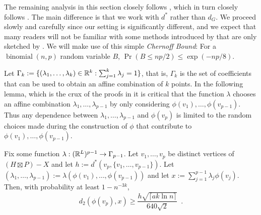 \documentclass{patmorin}
\renewcommand{\ge}{\geqslant}
\renewcommand{\le}{\leqslant}
\newcommand{\defin}[1]{\emph{\textcolor{brightmaroon}{#1}}}
\begin{document}
The remaining analysis in this section closely follows \citet{rao:small}, which in turn closely follows \citet{feige:approximating}.  The main difference is that we work with $d^*$ rather than $d_G$.  We proceed slowly and carefully since our setting is significantly different, and we expect that many readers will not be familiar with some methods introduced by \citet{feige:approximating} that are only sketched by \citet{rao:small}. We will make use of this simple \defin{Chernoff Bound}:  For a $\operatorname{binomial}(n,p)$ random variable $B$, $\Pr(B \le np/2) \le \exp(-np/8)$.

Let $\Gamma_k:=\{(\lambda_1,\ldots,\lambda_k)\in \mathbb{R}^k:\sum_{j=1}^k\lambda_j=1\}$, that is, $\Gamma_k$ is the set of coefficients that can be used to obtain an affine combination of $k$ points.  In the following lemma, which is the crux of the proofs in \cite{rao:small,feige:approximating} it is critical that the function $\lambda$ chooses an affine combination $\lambda_1,\ldots,\lambda_{p-1}$ by only considering $\phi(v_1),\ldots,\phi(v_{p-1})$.  Thus any dependence between $\lambda_1,\ldots,\lambda_{p-1}$ and $\phi(v_p)$ is limited to the random choices made during the construction of $\phi$ that contribute to $\phi(v_1),\ldots,\phi(v_{p-1})$.


\begin{clm}\label{crux}
  Fix some function $\lambda:(\mathbb{R}^{L})^{p-1}\to \Gamma_{p-1}$.
  Let $v_1,\ldots,v_p$ be distinct vertices of $(H\boxtimes P)-X$ and let $h:=d^*(v_p,\{v_1,\ldots,v_{p-1}\})$.  Let $(\lambda_1,\ldots,\lambda_{p-1}):=\lambda(\phi(v_1),\ldots,\phi(v_{p-1}))$ and let $x:=\sum_{j=1}^{p-1}\lambda_j\phi(v_j)$.
  Then, with probability at least $1-n^{-3k}$,
  \[
    d_2(\phi(v_p),x)\ge \frac{h\sqrt{\lceil ak\ln n\rceil}}{640\sqrt{2}} \enspace .
  \]
\end{clm}
\end{document}
